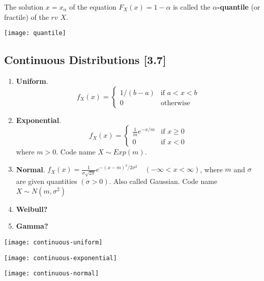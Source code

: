 \documentclass[a4paper,9pt]{extarticle}
\begin{document}
\begin{multicols*}{2}
The solution $x = x_\alpha$ of the equation $F_X(x) = 1 - \alpha$
is called the \textbf{$\alpha$-quantile} (or fractile) of the $rv$ $X$.

{\centering \texttt{[image: quantile]} \par}

\subsection{Continuous Distributions [3.7]}
\begin{enumerate}[label=\bfseries (\alph*)]
    \item \textbf{Uniform}. \begin{equation}
        f_X(x)=\begin{cases}
            1/(b-a) & \text{if $a < x < b$}\\
            0 & \text{otherwise}
        \end{cases}
    \end{equation}
    \item \textbf{Exponential}. \begin{equation}
        f_X(x)=\begin{cases}
            \frac{1}{m} e^{-x/m} & \text{if $x \geq 0$}\\
            0 & \text{if $x < 0$}
        \end{cases}
    \end{equation} where $m > 0$. Code name $X \sim Exp(m)$.
    \item \textbf{Normal}. $f_X(x) = \frac{1}{\sigma \sqrt{2 \pi}} e^{-(x-m)^2 / 2 \sigma^2} \quad (-\infty < x < \infty)$, where $m$ and $\sigma$ are given quantities $(\sigma > 0)$. Also called Gaussian. Code name $X \sim N(m, \sigma^2)$
    \item \textbf{Weibull?}
    \item \textbf{Gamma?}
\end{enumerate}

{\centering \texttt{[image: continuous-uniform]} \par}
{\centering \texttt{[image: continuous-exponential]} \par}
{\centering \texttt{[image: continuous-normal]} \par}

\end{multicols*}
\end{document}
